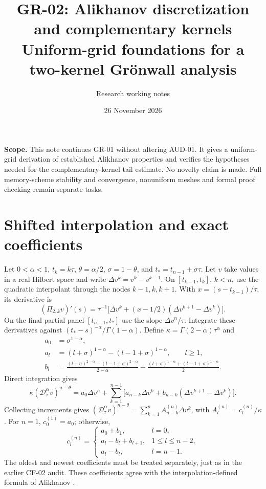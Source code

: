 \documentclass[11pt,a4paper]{article}
\title{GR-02: Alikhanov discretization and complementary kernels\\\large Uniform-grid foundations for a two-kernel Gr\"onwall analysis}
\author{Research working notes}
\date{26 November 2026}
\newcommand{\D}{\mathcal D_\tau^\alpha}
\begin{document}
\maketitle
\noindent\textbf{Scope.} This note continues GR-01 without altering AUD-01. It gives a uniform-grid derivation of established Alikhanov properties and verifies the hypotheses needed for the complementary-kernel tail estimate. No novelty claim is made. Full memory-scheme stability and convergence, nonuniform meshes and formal proof checking remain separate tasks.
\section{Shifted interpolation and exact coefficients}
Let $0<\alpha<1$, $t_k=k\tau$, $\theta=\alpha/2$, $\sigma=1-\theta$, and $t_*=t_{n-1}+\sigma\tau$. Let $v$ take values in a real Hilbert space and write $\Delta v^k=v^k-v^{k-1}$. On $[t_{k-1},t_k]$, $k<n$, use the quadratic interpolant through the nodes $k-1,k,k+1$. With $x=(s-t_{k-1})/\tau$, its derivative is
\[
 (\Pi_{2,k}v)'(s)=\tau^{-1}\big[\Delta v^k+(x-1/2)(\Delta v^{k+1}-\Delta v^k)\big].
\]
On the final partial panel $[t_{n-1},t_*]$ use the slope $\Delta v^n/\tau$. Integrate these derivatives against $(t_*-s)^{-\alpha}/\Gamma(1-\alpha)$. Define $\kappa=\Gamma(2-\alpha)\tau^\alpha$ and
\begin{align*}
 a_0&=\sigma^{1-\alpha},\\
 a_l&=(l+\sigma)^{1-\alpha}-(l-1+\sigma)^{1-\alpha},\qquad l\ge1,\\
 b_l&=\frac{(l+\sigma)^{2-\alpha}-(l-1+\sigma)^{2-\alpha}}{2-\alpha}
 -\frac{(l+\sigma)^{1-\alpha}+(l-1+\sigma)^{1-\alpha}}2.
\end{align*}
Direct integration gives
\[
 \kappa(\D v)^{n-\theta}=a_0\Delta v^n+\sum_{k=1}^{n-1}\big[a_{n-k}\Delta v^k+b_{n-k}(\Delta v^{k+1}-\Delta v^k)\big].
\]
Collecting increments gives $ (\D v)^{n-\theta}=\sum_{k=1}^n A_{n-k}^{(n)}\Delta v^k$, with $A_l^{(n)}=c_l^{(n)}/\kappa$. For $n=1$, $c_0^{(1)}=a_0$; otherwise,
\[
 c_l^{(n)}=\begin{cases}
 a_0+b_1,&l=0,\\
 a_l-b_l+b_{l+1},&1\le l\le n-2,\\
 a_l-b_l,&l=n-1.
 \end{cases}
\]
The oldest and newest coefficients must be treated separately, just as in the earlier CF-02 audit. These coefficients agree with the interpolation-defined formula of Alikhanov \cite{alikhanov}.
\end{document}
